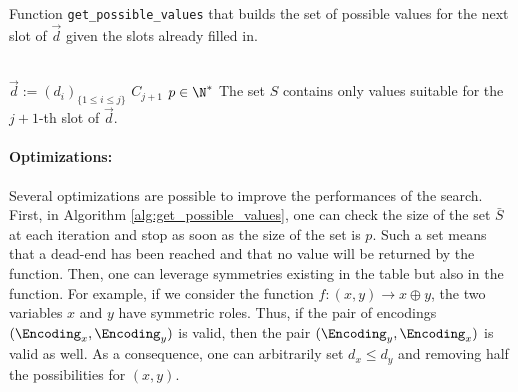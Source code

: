 \begin{algorithm}
    \caption{Function \texttt{get\_possible\_values} that builds the set of possible values for the next slot of $\vec{d}$ given the slots already filled in.}
    \label{alg:get_possible_values}
    \begin{algorithmic}
        \Require \\
        $\vec{d}:= (d_i)_{\{1 \le i \le j\}}$    \newline
        $C_{j + 1}$     \newline
        $p \in \N^*$     \newline
        \Ensure The set $S$ contains only values suitable for the $j+1$-th slot of $\vec{d}$.
         
             
             
        \EndFor
    \end{algorithmic}
\end{algorithm}

\paragraph{Optimizations:} Several optimizations are possible to improve the performances of the search. First, in Algorithm \ref{alg:get_possible_values}, one can check the size of the set $\bar S$ at each iteration and stop as soon as the size of the set is $p$. Such a set means that a dead-end has been reached and that no value will be returned by the function. Then, one can leverage symmetries existing in the table but also in the function. For example, if we consider the function $f: (x, y) \longrightarrow x \oplus y$, the two variables $x$ and $y$ have symmetric roles. Thus, if the pair of encodings $(\Encoding_x, \Encoding_y)$ is valid, then the pair $(\Encoding_y, \Encoding_x)$ is valid as well. As a consequence, one can arbitrarily set $d_x \le d_y$ and removing half the possibilities for $(x, y)$.




